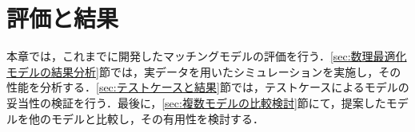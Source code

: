\section{評価と結果}
  \label{sec:評価と結果}
    \par
  
      \par 本章では，これまでに開発したマッチングモデルの評価を行う．\ref{sec:数理最適化モデルの結果分析}節では，実データを用いたシミュレーションを実施し，その性能を分析する．\ref{sec:テストケースと結果}節では，テストケースによるモデルの妥当性の検証を行う．最後に，\ref{sec:複数モデルの比較検討}節にて，提案したモデルを他のモデルと比較し，その有用性を検討する．
  
